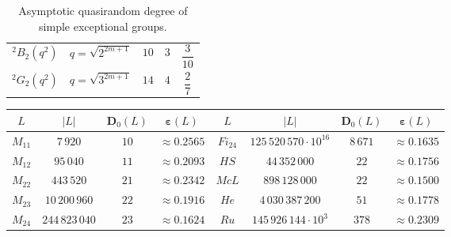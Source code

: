 \documentclass{daj}
\theoremstyle{definition}
\theoremstyle{remark}
\newcommand{\D}{\mathbf{D}}
\renewcommand{\a}{\boldsymbol{\varepsilon}}
\begin{document}
{\begin{table}[ht]
\begin{tabular}{| c c | c c c |}
		\phantom{$\dfrac{1^1}{1_{1_1}}$}\hspace{-6mm}
		$^2B_2(q^2)$ & $q=\sqrt{2^{2m+1}}$ & $10$ & $3$ &  $\dfrac{3}{10}$ \\
		
		\phantom{$\dfrac{1^1}{1_{1_1}}$}\hspace{-6mm}
		$^2G_2(q^2)$ & $q=\sqrt{3^{2m+1}}$ & $14$ & $4$ & $\dfrac{2}{7}$ \\
		
		\hline
	\end{tabular}
	\medskip
	{\caption{Asymptotic quasirandom degree of simple exceptional groups.}
	\label{tableLieEx}}
\end{table}
}

{\small

\begin{table}
	\centering
	\begin{tabular}{| c | c c c || c | c c c |}
		\hline
		
		\phantom{$\dfrac{1^1}{1_{1_1}}$}\hspace{-6mm}
		$L$ & $|L|$ & $\D_0(L)$ & $\a(L)$ & $L$ & $|L|$ & $\D_0(L)$ & $\a(L)$ \\
		
		\hline \hline
		
		\phantom{$\dfrac{1^1}{1_{1_1}}$}\hspace{-6mm}
		$M_{11}$ & $7\,920$ & $10$ & $\approx 0.2565$ &
		$Fi_{24}$ & $125\,520\,570\cdot 10^{16}$ & $8\,671$ & $\approx 0.1635$ \\
		
		\phantom{$\dfrac{1^1}{1_{1_1}}$}\hspace{-6mm}
		$M_{12}$ & $95\,040$ & $11$ & $\approx 0.2093$ &
		$HS$ & $44\,352\,000$ & $22$ & $\approx 0.1756$ \\
		
		\phantom{$\dfrac{1^1}{1_{1_1}}$}\hspace{-6mm}
		$M_{22}$ & $443\,520$ & $21$ & $\approx 0.2342$ &
		$McL$ & $898\,128\,000$ & $22$ & $\approx 0.1500$ \\
		
		\phantom{$\dfrac{1^1}{1_{1_1}}$}\hspace{-6mm}
		$M_{23}$ & $10\,200\,960$ & $22$ & $\approx 0.1916$ &
		$He$ & $4\,030\,387\,200$ & $51$ & $\approx 0.1778$ \\
		
		\phantom{$\dfrac{1^1}{1_{1_1}}$}\hspace{-6mm}
		$M_{24}$ & $244\,823\,040$ & $23$ & $\approx 0.1624$ & 
		$Ru$ & $145\,926\,144\cdot 10^3$ & $378$ & $\approx 0.2309$ \\
		

\end{tabular}
\end{table}}
\end{document}
